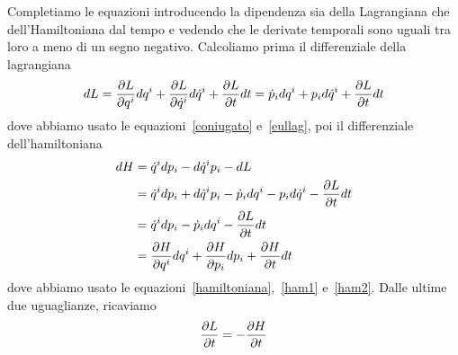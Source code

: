     Completiamo le equazioni introducendo la dipendenza sia della Lagrangiana che dell'Hamiltoniana dal tempo e vedendo che le derivate temporali sono uguali tra loro a meno di un segno negativo. Calcoliamo prima il differenziale della lagrangiana
    \begin{equation} \label{h3}
        dL = \frac{\partial L}{\partial q^i} dq^i + \frac{\partial L}{\partial\dot q^i} d\dot q^i + \frac{\partial L}{\partial t} dt = \dot p_i dq^i + p_i d\dot q^i + \frac{\partial L}{\partial t} dt 
    \end{equation}
    dove abbiamo usato le equazioni~\eqref{coniugato} e~\eqref{eullag}, poi il differenziale dell'hamiltoniana
    \begin{equation*} \label{h4}
    \begin{aligned}
        dH & = \dot q^i dp_i - d \dot q^i p_i - dL \\ & = \dot q^i dp_i + d \dot q^i p_i - \dot p_i dq^i - p_i d\dot q^i - \frac{\partial L}{\partial t} dt \\ & = \dot q^i dp_i - \dot p_i dq^i - \frac{\partial L}{\partial t} dt \\ & = \frac{\partial H}{\partial q^i} dq^i + \frac{\partial H}{\partial p_i} dp_i + \frac{\partial H}{\partial t} dt
    \end{aligned}
    \end{equation*}
    dove abbiamo usato le equazioni~\eqref{hamiltoniana},~\eqref{ham1} e~\eqref{ham2}. Dalle ultime due uguaglianze, ricaviamo  
    \begin{equation*}
        \frac{\partial L}{\partial t} = - \frac{\partial H}{\partial t}
    \end{equation*}

\hfill 

